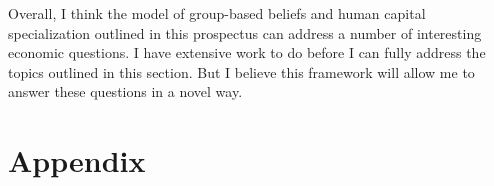 \documentclass[11 pt]{article}
\newcommand{\toedit}[1]{{\color{gray}#1}}
\newcommand{\toedit}[1]{#1}
\begin{document}



Overall, I think the model of group-based beliefs and human capital specialization outlined in this prospectus can address a number of interesting economic questions. 
I have extensive work to do before I can fully address the topics outlined in this section.
But I believe this framework will allow me to answer these questions in a novel way.


\printbibliography

\section*{Appendix}
\setcounter{section}{0}
\setcounter{subsection}{0}
\renewcommand{\thesubsection}{A.\arabic{subsection}}



% 
\end{document}
